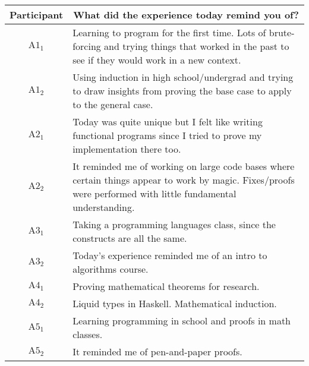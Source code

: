 \noindent
\begin{tabularx}{\linewidth}{@{}cX@{}}
  \toprule
  Participant & \multicolumn{1}{c}{
    \textbf{What did the experience today remind you of?}
  } \\ \midrule
  $\text{A}1_{1}$ & Learning to program for the first time. Lots of brute-forcing and trying things that worked in the past to see if they would work in a new context. \\
  $\text{A}1_{2}$ & Using induction in high school/undergrad and trying to draw insights from proving the base case to apply to the general case. \\
  $\text{A}2_{1}$ & Today was quite unique but I felt like writing functional programs since I tried to prove my implementation there too. \\
  $\text{A}2_{2}$ & It reminded me of working on large code bases where certain things appear to work by magic.  Fixes/proofs were performed with little fundamental understanding. \\
  $\text{A}3_{1}$ & Taking a programming languages class, since the constructs are all the same. \\
  $\text{A}3_{2}$ & Today's experience reminded me of an intro to algorithms course. \\
  $\text{A}4_{1}$ & Proving mathematical theorems for research. \\
  $\text{A}4_{2}$ & Liquid types in Haskell.  Mathematical induction. \\
  $\text{A}5_{1}$ & Learning programming in school and proofs in math classes. \\
  $\text{A}5_{2}$ & It reminded me of pen-and-paper proofs. \\
  \bottomrule
\end{tabularx}{\parfillskip=0pt\par}

\clearpage

